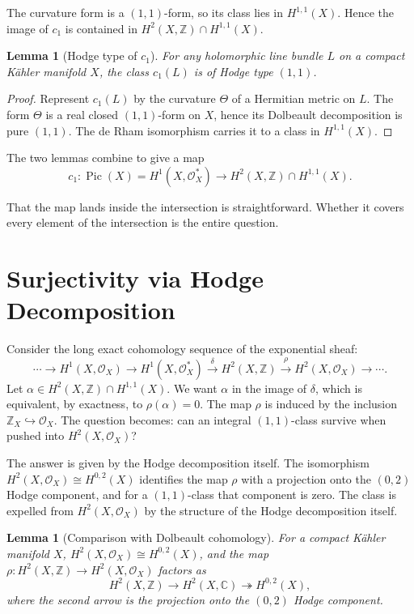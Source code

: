 \documentclass[12pt]{article}
\theoremstyle{plain}
\newtheorem{lemma}[theorem]{Lemma}
\theoremstyle{definition}
\begin{document}
The curvature form is a $(1,1)$-form, so its class lies in $H^{1,1}(X)$. 
Hence the image of $c_1$ is contained in $H^2(X,\mathbb Z) \cap H^{1,1}(X)$.

\begin{lemma}[Hodge type of $c_1$]\label{lem:c1-type}
For any holomorphic line bundle $L$ on a compact K\"ahler manifold $X$, the class $c_1(L)$ is of Hodge type $(1,1)$.
\end{lemma}

\begin{proof}
Represent $c_1(L)$ by the curvature $\Theta$ of a Hermitian metric on $L$. 
The form $\Theta$ is a real closed $(1,1)$-form on $X$, hence its Dolbeault decomposition is pure $(1,1)$. 
The de Rham isomorphism carries it to a class in $H^{1,1}(X)$.
\end{proof}

The two lemmas combine to give a map
\[
c_1: \operatorname{Pic}(X) = H^1(X,\mathcal O_X^*) \longrightarrow H^2(X,\mathbb Z) \cap H^{1,1}(X).
\]

That the map lands inside the intersection is straightforward. 
Whether it covers every element of the intersection is the entire question.

\section{Surjectivity via Hodge Decomposition}

Consider the long exact cohomology sequence of the exponential sheaf:
\[
\cdots \longrightarrow H^1(X,\mathcal O_X) \longrightarrow H^1(X,\mathcal O_X^*) \xrightarrow{\;\delta\;} H^2(X,\mathbb Z) \xrightarrow{\;\rho\;} H^2(X,\mathcal O_X) \longrightarrow \cdots .
\]
Let $\alpha \in H^2(X,\mathbb Z) \cap H^{1,1}(X)$. 
We want $\alpha$ in the image of $\delta$, which is equivalent, by exactness, to $\rho(\alpha)=0$. 
The map $\rho$ is induced by the inclusion $\mathbb Z_X \hookrightarrow \mathcal O_X$. 
The question becomes: can an integral $(1,1)$-class survive when pushed into $H^2(X,\mathcal O_X)$?

The answer is given by the Hodge decomposition itself. 
The isomorphism $H^2(X,\mathcal O_X) \cong H^{0,2}(X)$ identifies the map $\rho$ with a projection onto the $(0,2)$ Hodge component, and for a $(1,1)$-class that component is zero. 
The class is expelled from $H^2(X,\mathcal O_X)$ by the structure of the Hodge decomposition itself.

\begin{lemma}[Comparison with Dolbeault cohomology]\label{lem:H2-O}
For a compact K\"ahler manifold $X$, $H^2(X,\mathcal O_X) \cong H^{0,2}(X)$, and the map $\rho: H^2(X,\mathbb Z) \to H^2(X,\mathcal O_X)$ factors as
\[
H^2(X,\mathbb Z) \longrightarrow H^2(X,\mathbb C) \twoheadrightarrow H^{0,2}(X),
\]
where the second arrow is the projection onto the $(0,2)$ Hodge component.
\end{lemma}
\end{document}
